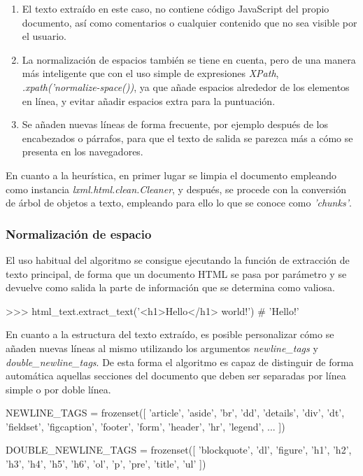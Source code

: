 \begin{enumerate}
  \item El texto extraído en este caso, no contiene código JavaScript del propio documento, así como 
  comentarios o cualquier contenido que no sea visible por el usuario.
  \item La normalización de espacios también se tiene en cuenta, pero de una manera más inteligente que
  con el uso simple de expresiones \emph{XPath}, \emph{.xpath('normalize-space())}, ya que añade espacios 
  alrededor de los elementos en línea, y evitar añadir espacios extra para la puntuación.
  \item Se añaden nuevas líneas de forma frecuente, por ejemplo después de los encabezados o párrafos, para 
  que el texto de salida se parezca más a cómo se presenta en los navegadores.
\end{enumerate}

En cuanto a la heurística, en primer lugar se limpia el documento empleando como instancia
\emph{lxml.html.clean.Cleaner}, y después, se procede con la conversión de árbol de objetos a texto,
empleando para ello lo que se conoce como \emph{'chunks'}.

\subsubsection{Normalización de espacio}
\label{subsubsec:normalizacion de espacio}

El uso habitual del algoritmo se consigue ejecutando la función de extracción de texto principal, de forma 
que un documento HTML se pasa por parámetro y se devuelve como salida la parte de información que se determina
como valiosa.

\begin{Schunk}
  \begin{Soutput}
    >>> html_text.extract_text('<h1>Hello</h1> world!')
    # 'Hello\n\nworld!'
  \end{Soutput}
\end{Schunk}

En cuanto a la estructura del texto extraído, es posible personalizar cómo se añaden nuevas líneas al mismo
utilizando los argumentos \emph{newline\_tags} y \emph{double\_newline\_tags}. De esta forma el algoritmo 
es capaz de distinguir de forma automática aquellas secciones del documento que deben ser separadas por 
línea simple o por doble línea.

\begin{Schunk}
  \begin{Soutput}
    NEWLINE_TAGS = frozenset([
      'article', 'aside', 'br', 'dd', 'details', 'div', 'dt', 'fieldset',
      'figcaption', 'footer', 'form', 'header', 'hr', 'legend', ...
    ])

    DOUBLE_NEWLINE_TAGS = frozenset([
      'blockquote', 'dl', 'figure', 'h1', 'h2', 'h3', 'h4', 'h5', 'h6', 'ol',
      'p', 'pre', 'title', 'ul'
    ])
  \end{Soutput}
\end{Schunk}

